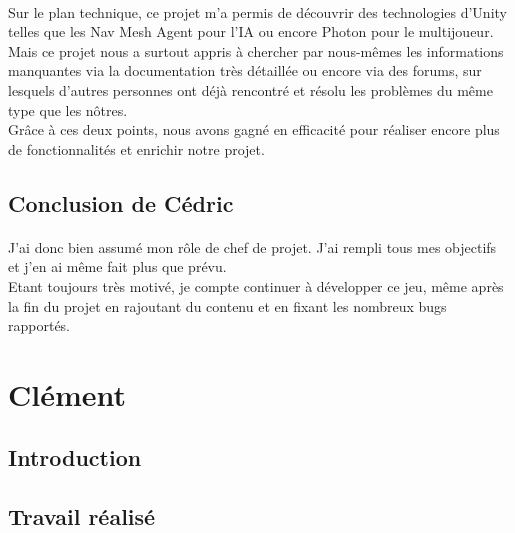 \documentclass[titlepage, 13px, a4paper]{report}
\begin{document}
\paragraph{} \hspace{0pt}
Sur le plan technique, ce projet m’a permis de découvrir des technologies d’Unity telles que les Nav Mesh Agent 
pour l’IA ou encore Photon pour le multijoueur.
Mais ce projet nous a surtout appris à chercher par nous-mêmes les informations manquantes via la documentation 
très détaillée ou encore via des forums, sur lesquels d’autres personnes ont déjà rencontré 
et résolu les problèmes du même type que les nôtres. \\
Grâce à ces deux points, nous avons gagné en efficacité pour réaliser encore plus de fonctionnalités 
et enrichir notre projet. \\


\subsection{Conclusion de Cédric}
\paragraph{} \hspace{0pt}
J’ai donc bien assumé mon rôle de chef de projet. J’ai rempli tous mes objectifs et 
j’en ai même fait plus que prévu. \\
Etant toujours très motivé, je compte continuer à développer ce jeu, même après la fin du projet en rajoutant du 
contenu et en fixant les nombreux bugs rapportés. \\


\newpage
\section{Clément}
\subsection{Introduction}
\paragraph{} \hspace{0pt}

\subsection{Travail réalisé}
\paragraph{} \hspace{0pt}
\end{document}

